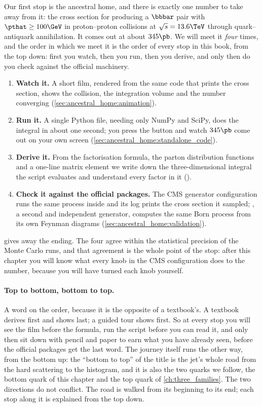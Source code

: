 Our first stop is the ancestral home, and there is exactly one number to take
away from it: the cross section for producing a $\bbbar$ pair with
$\pthat\ge100\GeV$ in proton--proton collisions at $\sqrt{s}=13.6\TeV$
through quark--antiquark annihilation. It comes out at about $345\pb$. We
will meet it \emph{four} times, and the order in which we meet it is the
order of every stop in this book, from the top down: first you watch, then
you run, then you derive, and only then do you check against the official
machinery.
\begin{enumerate}[nosep]
  \item \textbf{Watch it.} A short film, rendered from the same code that
    prints the cross section, shows the collision, the integration volume
    and the number converging (\cref{sec:ancestral_home:animation}).
  \item \textbf{Run it.} A single Python file, needing only NumPy and SciPy,
    does the integral in about one second; you press the button and watch
    $345\pb$ come out on your own screen
    (\cref{sec:ancestral_home:standalone_code}).
  \item \textbf{Derive it.} From the factorisation formula, the parton
    distribution functions and a one-line matrix element we write down the
    three-dimensional integral the script evaluates and understand every
    factor in it
    ().
  \item \textbf{Check it against the official packages.} The CMS generator
    configuration runs the same process inside \PYTHIA and its log prints
    the cross section it sampled; \MG, a second and independent generator,
    computes the same Born process from its own Feynman diagrams
    (\cref{sec:ancestral_home:validation}).
\end{enumerate}
 gives away the ending. The four agree
within the statistical precision of the Monte Carlo runs, and that agreement
is the whole point of the stop: after this chapter you will know what every
knob in the CMS configuration does to the number, because you will have turned
each knob yourself.

\paragraph{Top to bottom, bottom to top.} A word on the order, because it
is the opposite of a textbook's. A textbook derives first and shows last; a
guided tour shows first. So at every stop you will see the film before the
formula, run the script before you can read it, and only then sit down with
pencil and paper to earn what you have already seen, before the official
packages get the last word. The journey itself runs the other way, from the
bottom up: the ``bottom to top'' of the title is the jet's whole road from
the hard scattering to the histogram, and it is also the two quarks we
follow, the bottom quark of this chapter and the top quark of
\cref{ch:three_families}. The two directions do not conflict. The road is
walked from its beginning to its end; each stop along it is explained from
the top down.

